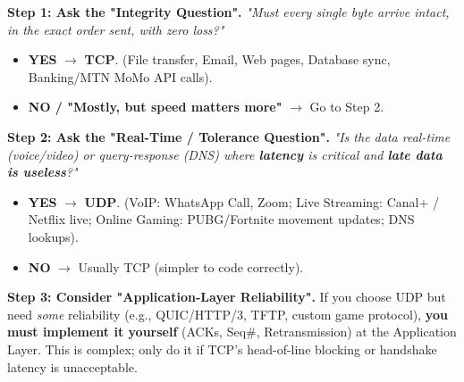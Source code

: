 \documentclass[11pt]{article}
\begin{document}
\begin{methode}
\textbf{Step 1: Ask the "Integrity Question".} \emph{"Must every single byte arrive intact, in the exact order sent, with zero loss?"}
\begin{itemize}
    \item \textbf{YES} $\to$ \textbf{TCP}. (File transfer, Email, Web pages, Database sync, Banking/MTN MoMo API calls).
    \item \textbf{NO / "Mostly, but speed matters more"} $\to$ Go to Step 2.
\end{itemize}

\textbf{Step 2: Ask the "Real-Time / Tolerance Question".} \emph{"Is the data real-time (voice/video) or query-response (DNS) where \textbf{latency} is critical and \textbf{late data is useless}?"}
\begin{itemize}
    \item \textbf{YES} $\to$ \textbf{UDP}. (VoIP: WhatsApp Call, Zoom; Live Streaming: Canal+ / Netflix live; Online Gaming: PUBG/Fortnite movement updates; DNS lookups).
    \item \textbf{NO} $\to$ Usually TCP (simpler to code correctly).
\end{itemize}

\textbf{Step 3: Consider "Application-Layer Reliability".} If you choose UDP but need \emph{some} reliability (e.g., QUIC/HTTP/3, TFTP, custom game protocol), \textbf{you must implement it yourself} (ACKs, Seq\#, Retransmission) at the Application Layer. This is complex; only do it if TCP's head-of-line blocking or handshake latency is unacceptable.
\end{methode}
\end{document}
